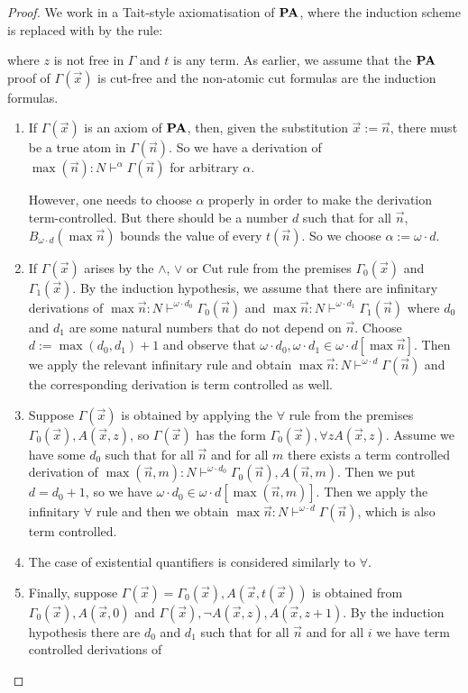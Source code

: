 \documentclass[8pt]{article}
\theoremstyle{definition}
\theoremstyle{definition}
\theoremstyle{definition}
\theoremstyle{definition}
\theoremstyle{definition}
\theoremstyle{definition}
\theoremstyle{definition}
\theoremstyle{definition}
\theoremstyle{definition}
\theoremstyle{definition}
\theoremstyle{definition}
\theoremstyle{definition}
\theoremstyle{definition}
\theoremstyle{question}
\begin{document}
\begin{proof}
  We work in a Tait-style axiomatisation of ${\bf PA}$, where the induction scheme is replaced with
  by the rule:
  \begin{prooftree}
  \end{prooftree}
  where $z$ is not free in $\Gamma$ and $t$ is any term.
  As earlier, we assume that the ${\bf PA}$ proof of $\Gamma(\vec{x})$ is cut-free and
  the non-atomic cut formulas are the induction formulas.
  \begin{enumerate}
    \item If $\Gamma(\vec{x})$ is an axiom of ${\bf PA}$, then, given the substitution $\vec{x} := \vec{n}$, 
    there must be a true atom in $\Gamma(\vec{n})$. So we have a derivation of 
    $\max(\vec{n}) : N \vdash^{\alpha} \Gamma(\vec{n})$ for arbitrary $\alpha$.

    However, one needs to choose $\alpha$ properly in order to make the derivation term-controlled.
    But there should be a number $d$ such that for all $\vec{n}$, $B_{\omega \cdot d}(\max \vec{n})$
    bounds the value of every $t(\vec{n})$. So we choose $\alpha := \omega \cdot d$.
    \item If $\Gamma(\vec{x})$ arises by the $\wedge$, $\lor$ or Cut rule from the premises
    $\Gamma_0(\vec{x})$ and $\Gamma_1(\vec{x})$. By the induction hypothesis, we assume that there
    are infinitary derivations of $\max \vec{n} : N \vdash^{\omega \cdot d_0} \Gamma_0(\vec{n})$
    and $\max \vec{n} : N \vdash^{\omega \cdot d_1} \Gamma_1(\vec{n})$
    where $d_0$ and $d_1$ are some natural numbers that do not depend on $\vec{n}$.
    Choose $d := \max(d_0, d_1) + 1$ and observe that $\omega \cdot d_0, \omega \cdot d_1 \in \omega \cdot d[\max \vec{n}]$.
    Then we apply the relevant infinitary rule and obtain $\max \vec{n} : N \vdash^{\omega \cdot d} \Gamma(\vec{n})$
    and the corresponding derivation is term controlled as well.
    \item Suppose $\Gamma(\vec{x})$ is obtained by applying the $\forall$ rule from the premises
    $\Gamma_0(\vec{x}), A(\vec{x}, z)$, so $\Gamma(\vec{x})$ has the form $\Gamma_0(\vec{x}), \forall z A(\vec{x}, z)$.
    Assume we have some $d_0$ such that for all $\vec{n}$ and for all $m$ there exists a term controlled derivation
    of $\max(\vec{n}, m) : N \vdash^{\omega \cdot d_0} \Gamma_0(\vec{n}), A(\vec{n}, m)$.
    Then we put $d = d_0 + 1$, so we have $\omega \cdot d_0 \in \omega \cdot d[\max(\vec{n}, m)]$.
    Then we apply the infinitary $\forall$ rule and then we obtain 
    $\max \vec{n} : N \vdash^{\omega \cdot d} \Gamma(\vec{n})$, which is also term controlled.
    \item The case of existential quantifiers is considered similarly to $\forall$.
    \item Finally, suppose $\Gamma(\vec{x}) = \Gamma_0(\vec{x}), A(\vec{x}, t(\vec{x}))$
    is obtained from $\Gamma_0(\vec{x}), A(\vec{x}, 0)$ and
    $\Gamma(\vec{x}), \neg A(\vec{x}, z), A(\vec{x}, z + 1)$. By the induction hypothesis
    there are $d_0$ and $d_1$ such that for all $\vec{n}$ and for all $i$ we have term controlled derivations of


\end{enumerate}
\end{proof}
\end{document}
